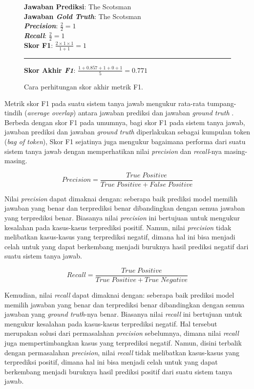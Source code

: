 \begin{figure}[h]
\textbf{Jawaban Prediksi}: The Scotsman\\
\textbf{Jawaban \emph{Gold Truth}}: The Scotsman\\
\textbf{\emph{Precision}}: $\frac{2}{2}=1$\\
\textbf{\emph{Recall}}: $\frac{2}{2}=1$\\
\textbf{Skor F1}: $\frac{2 \times 1 \times 1}{1 + 1}=1$

\vspace{3pt}
\hrule
\vspace{3pt}

\textbf{Skor Akhir \emph{F1}}: $\frac{1+0.857+1+0+1}{5}=0.771$

\centering
\caption{Cara perhitungan skor akhir metrik F1.}
\end{figure}

Metrik skor F1  pada suatu sistem tanya jawab mengukur rata-rata tumpang-tindih (\emph{average overlap}) antara jawaban prediksi dan jawaban \emph{ground truth} \citep{rajpurkar-etal-2016-squad}. Berbeda dengan skor F1 pada umumnya, bagi \citeauthor{rajpurkar-etal-2016-squad} skor F1 pada sistem tanya jawab, jawaban prediksi dan jawaban \emph{ground truth} diperlakukan sebagai kumpulan token (\emph{bag of token}), Skor F1 sejatinya juga mengukur bagaimana performa dari suatu sistem tanya jawab dengan memperhatikan nilai \emph{precision} dan \emph{recall}-nya masing-masing. 


\begin{equation}
Precision = \frac{True \; Positive}{True \; Positive + False \; Positive}
\end{equation}

Nilai \emph{precision} dapat dimaknai dengan: seberapa baik prediksi model memilih jawaban yang benar dan terprediksi benar dibandingkan dengan semua jawaban yang terprediksi benar. Biasanya nilai \emph{precision} ini bertujuan untuk mengukur kesalahan pada kasus-kasus terprediksi positif. Namun, nilai \emph{precision} tidak melibatkan kasus-kasus yang terprediksi negatif, dimana hal ini bisa menjadi celah untuk yang dapat berkembang menjadi buruknya hasil prediksi negatif dari suatu sistem tanya jawab.

\begin{equation}
Recall = \frac{True \; Positive}{True \; Positive + True \; Negative}
\end{equation}

Kemudian, nilai \emph{recall} dapat dimaknai dengan: seberapa baik prediksi model memilih jawaban yang benar dan terprediksi benar dibandingkan dengan semua jawaban yang \emph{ground truth}-nya benar. Biasanya nilai \emph{recall} ini bertujuan untuk mengukur kesalahan pada kasus-kasus terprediksi negatif. Hal tersebut merupakan solusi dari permasalahan \emph{precision} sebelumnya, dimana nilai \emph{recall} juga mempertimbangkan kasus yang terprediksi negatif. Namun, disini terbalik dengan permasalahan \emph{precision}, nilai \emph{recall} tidak melibatkan kasus-kasus yang terprediksi positif, dimana hal ini bisa menjadi celah untuk yang dapat berkembang menjadi buruknya hasil prediksi positif dari suatu sistem tanya jawab.

